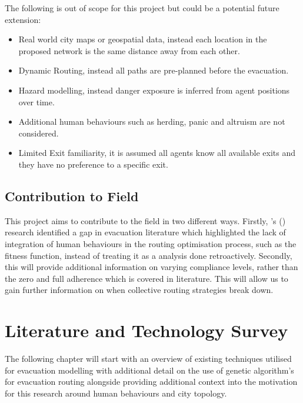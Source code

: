 \documentclass[12pt,a4paper]{report}
\begin{document}
The following is out of scope for this project but could be a potential future extension:
\begin{itemize}
\item Real world city maps or geospatial data, instead each location in the proposed network is the same distance away from each other.
\item Dynamic Routing, instead all paths are pre-planned before the evacuation.
\item Hazard modelling, instead danger exposure is inferred from agent positions over time.
\item Additional human behaviours such as herding, panic and altruism are not considered.
\item Limited Exit familiarity, it is assumed all agents know all available exits and they have no preference to a specific exit.
\end{itemize}  

\section{Contribution to Field}
This project aims to contribute to the field in two different ways. Firstly, \citeauthor{ALDAHLAWI_2024}'s (\citeyear{ALDAHLAWI_2024}) research identified a gap in evacuation literature which highlighted the lack of integration of human behaviours in the routing optimisation process, such as the fitness function, instead of treating it as a analysis done retroactively. Secondly, this will provide additional information on varying compliance levels, rather than the zero and full adherence which is covered in literature. This will allow us to gain further information on when collective routing strategies break down.


\chapter{Literature and Technology Survey}
The following chapter will start with an overview of existing techniques utilised for evacuation modelling with additional detail on the use of genetic algorithm's for evacuation routing alongside providing additional context into the motivation for this research around human behaviours and city topology.
\end{document}
